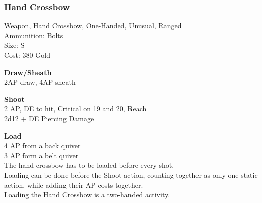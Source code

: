 \subsubsection{Hand Crossbow}\label{weapon:handCrossbow}
Weapon, Hand Crossbow, One-Handed, Unusual, Ranged\\
Ammunition: Bolts\\
Size: S\\
Cost: 380 Gold

\textbf{Draw/Sheath} \\
2AP draw, 4AP sheath

\textbf{Shoot} \\
2 AP, DE to hit, Critical on 19 and 20,  Reach\\
2d12 + \texttimes DE Piercing Damage

\textbf{Load} \\
4 AP from a back quiver\\
3 AP form a belt quiver\\
The hand crossbow has to be loaded before every shot.\\
Loading can be done before the Shoot action, counting together as only one static action, while adding their AP costs together.\\
Loading the Hand Crossbow is a two-handed activity.
